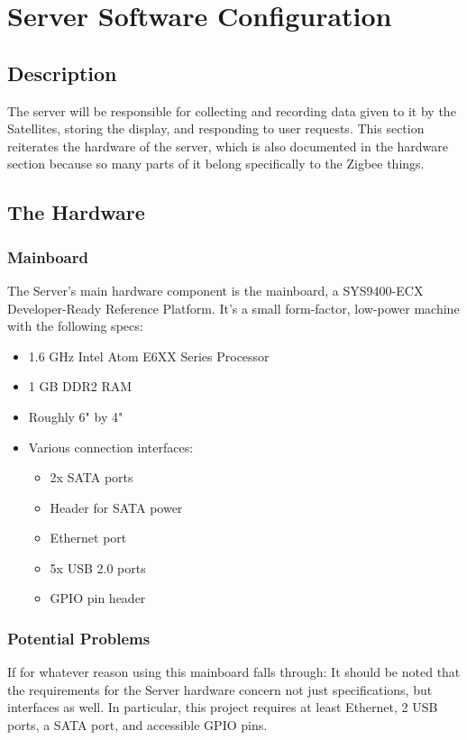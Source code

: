 \chapter{Server Software Configuration}

\section{Description}

The server will be responsible for collecting and recording data given to it by the Satellites, storing the display, and responding to user requests. 
This section reiterates the hardware of the server, which is also documented in the hardware section because so many parts of it belong specifically to the Zigbee things.

\section{The Hardware}

\subsection{Mainboard}
The Server's main hardware component is the mainboard, a SYS9400-ECX Developer-Ready Reference Platform. 
It's a small form-factor, low-power machine with the following specs:

\begin{itemize}
	\item 1.6 GHz Intel Atom E6XX Series Processor
	\item 1 GB DDR2 RAM
	\item Roughly 6" by 4"
	\item Various connection interfaces:
	\begin{itemize}
		\item 2x \ac{SATA} ports
		\item Header for \ac{SATA} power
		\item Ethernet port
		\item 5x \ac{USB} 2.0 ports
		\item \ac{GPIO} pin header
	\end{itemize}
\end{itemize}

\subsection{Potential Problems}
If for whatever reason using this mainboard falls through: 
It should be noted that the requirements for the Server hardware concern not just specifications, but interfaces as well.
In particular, this project requires at least Ethernet, 2 \ac{USB} ports, a \ac{SATA} port, and accessible \ac{GPIO} pins.

